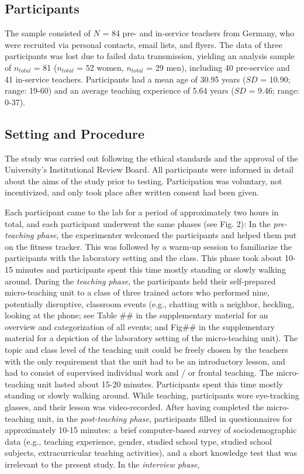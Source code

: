 \documentclass[preprint, 3p,
authoryear]{elsarticle} %
\begin{document}
\subsection{Participants}\label{participants}

The sample consisted of \(N\) = 84 pre- and in-service teachers from
Germany, who were recruited via personal contacts, email lists, and
flyers. The data of three participants was lost due to failed data
transmission, yielding an analysis sample of \(n_{total}\) = 81
(\(n_{total}\) = 52 women, \(n_{total}\) = 29 men), including 40
pre-service and 41 in-service teachers. Participants had a mean age of
30.95 years (\(SD\) = 10.90; range: 19-60) and an average teaching
experience of 5.64 years (\(SD\) = 9.46; range: 0-37).

\subsection{Setting and Procedure}\label{setting-and-procedure}

The study was carried out following the ethical standards and the
approval of the University's Institutional Review Board. All
participants were informed in detail about the aims of the study prior
to testing. Participation was voluntary, not incentivized, and only took
place after written consent had been given.

Each participant came to the lab for a period of approximately two hours
in total, and each participant underwent the same phases (see Fig. 2):
In the \emph{pre-teaching phase}, the experimenter welcomed the
participants and helped them put on the fitness tracker. This was
followed by a warm-up session to familiarize the participants with the
laboratory setting and the class. This phase took about 10-15 minutes
and participants spent this time mostly standing or slowly walking
around. During the \emph{teaching phase}, the participants held their
self-prepared micro-teaching unit to a class of three trained actors who
performed nine, potentially disruptive, classroom events (e.g., chatting
with a neighbor, heckling, looking at the phone; see Table \#\# in the
supplementary material for an overview and categorization of all events;
and Fig\#\# in the supplementary material for a depiction of the
laboratory setting of the micro-teaching unit). The topic and class
level of the teaching unit could be freely chosen by the teachers with
the only requirement that the unit had to be an introductory lesson, and
had to consist of supervised individual work and / or frontal teaching.
The micro-teaching unit lasted about 15-20 minutes. Participants spent
this time mostly standing or slowly walking around. While teaching,
participants wore eye-tracking glasses, and their lesson was
video-recorded. After having completed the micro-teaching unit, in the
\emph{post-teaching phase}, participants filled in questionnaires for
approximately 10-15 minutes: a brief computer-based survey of
sociodemographic data (e.g., teaching experience, gender, studied school
type, studied school subjects, extracurricular teaching activities), and
a short knowledge test that was irrelevant to the present study. In the
\emph{interview phase},
\end{document}
